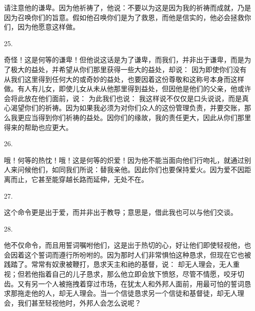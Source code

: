 请注意他的谦卑。因为他祈祷了，他说：不要以为这是因为我的祈祷而成就，乃是因为召唤你们的旨意。假如他召唤你们是为了救恩，而他是信实的，他必会拯救你们，因为他愿意这样做。\par

25. \par

奇怪！这是何等的谦卑！但他说这话是为了谦卑，而我们，并非出于谦卑，而是为了极大的益处，并希望从你们那里获得一些大的益处，却说： 因为即使你们没有从我们这里得到任何大的或奇妙的益处，也要因着这份尊敬和这称号本身而这样做。有人有儿女，即使儿女从未从他那里得到益处，但因他是他们的父亲，他或许会将此放在他们面前，说： 为此我们也说： 我这样说不仅仅是口头说说，而是真心渴望你们的祈祷。因为如果我必须为对你们众人的这份管理负责，并要交账，那么我更应当得到你们祈祷的益处。因你们的缘故，我的责任更大，因此从你们那里得来的帮助也应更大。\par

26. \par

哦！何等的热忱！哦！这是何等的炽爱！因为他不能当面向他们行吻礼，就通过别人来问候他们，如同我们所说：替我亲他。因此你们也要保持爱火。因为爱不因距离而止，它甚至能穿越长路而延伸，无处不在。\par

27. \par

这个命令更是出于爱，而并非出于教导；意思是，借此我也可以与他们交谈。\par

28. \par

他不仅命令，而且用誓词嘱咐他们，这是出于热切的心，好让他们即使轻视他，也会因着这个誓词而遵行所吩咐的。因为那时人们非常惧怕这种恳求，但现在它也被践踏了。常常有奴隶被鞭打，恳求天主和祂的基督，说： 却无人理会，无人重视；但若他指着自己的儿子恳求，那么他立即会放下愤怒，尽管不情愿，咬牙切齿。又有另一个人被拖拽着穿过市场，在犹太人和外邦人面前，用最可怕的誓词恳求那拖走他的人，却无人理会。当一个信徒恳求另一个信徒和基督徒，却无人理会，我们甚至轻视他时，外邦人会怎么说呢？\par

